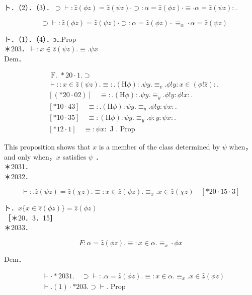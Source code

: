 \documentclass[10pt]{article}
\begin{document}
ト．（2）．（3）．$\supset \vdash: \hat{z}(\phi z)=\hat{z}(\psi z) \cdot \supset: \alpha=\hat{z}(\phi z) \cdot \equiv \cdot \alpha=\hat{z}(\psi z):$.


\begin{equation*}
[* 10 \cdot 11 \cdot 21] \quad \supset \vdash: \hat{z}(\phi z)=\hat{z}(\psi z) \cdot \supset: \alpha=\hat{z}(\phi z) \cdot \equiv_{\alpha} \cdot \alpha=\hat{z}(\psi z) \tag{3}
\end{equation*}


ト．（1）．（4）．ɔ…Prop\\
＊203．$\vdash: x \in \hat{z}(\psi z) . \equiv . \psi x$\\
Dem．

$$
\begin{aligned}
& \text { F. } * 20 \cdot 1 . \supset \\
& \vdash:: x \in \hat{z}(\psi z) . \equiv: .(\mathrm{H} \phi): . \psi y . \equiv_{v} . \phi!y: x \in(\phi!\hat{z}): . \\
& {[(* 20 \cdot 02)] \quad \equiv: .(\mathrm{H} \phi): . \psi y . \equiv_{y} . \phi!y: \phi!x: .} \\
& {[* 10 \cdot 43] \quad \equiv: .(\mathrm{H} \phi): \psi y . \equiv_{y} . \phi!y: \psi x: .} \\
& {[* 10 \cdot 35] \quad \equiv:(\mathrm{H} \phi): \psi y . \equiv_{y} . \phi: y: \psi x: .} \\
& {[* 12 \cdot 1] \quad \equiv: \psi x: \text { J . Prop }}
\end{aligned}
$$

This proposition shows that $x$ is a member of the class determined by $\psi$ when，and only when，$x$ satisfies $\psi$ ．\\
＊2031．\\
＊2032．

$$
\vdash: . \hat{z}(\psi z)=\hat{z}(\chi z) . \equiv: x \in \hat{z}(\psi z) . \equiv_{x} . x \in \hat{z}(\chi z) \quad[* 20 \cdot 15 \cdot 3]
$$

ト．$\hat{x}\{x \in \hat{z}(\phi z)\}=\hat{z}(\phi z)$\\
［＊20．3．15］\\
＊2033．

$$
F: \alpha=\hat{z}(\phi z) . \equiv: x \in \alpha . \equiv_{x} \cdot \phi x
$$

Dem．


\begin{align*}
& \vdash \cdot * 2031 . \quad \supset \vdash: . \alpha=\hat{z}(\phi z) . \equiv: x \in \alpha . \equiv_{x} . x \in \hat{z}(\phi z)  \tag{1}\\
& \vdash .(1) \cdot * 203 . \supset \vdash . \text { Prop }
\end{align*}
\end{document}
